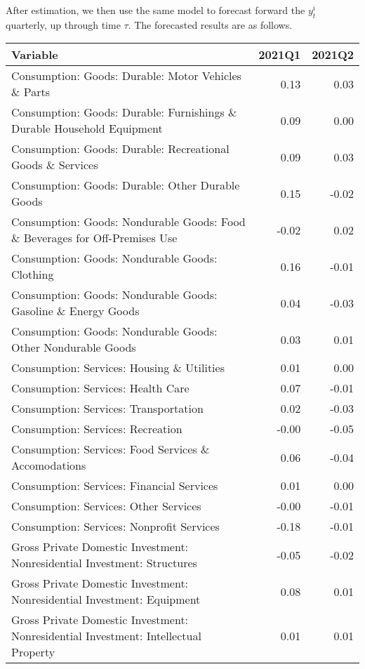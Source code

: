 \documentclass[11pt, letterpaper]{article}\usepackage[]{graphicx}\usepackage[]{color}
\begin{document}
After estimation, we then use the same model to forecast forward the $y^i_t$ quarterly, up through time $\tau$. 
The forecasted results are as follows.
\begin{table}[H]
\centering
\begingroup\scriptsize
\begin{tabular}{lrr}
  \hline
Variable & 2021Q1 & 2021Q2 \\ 
  \hline
Consumption: Goods: Durable: Motor Vehicles \& Parts & 0.13 & 0.03 \\ 
  Consumption: Goods: Durable: Furnishings \& Durable Household Equipment & 0.09 & 0.00 \\ 
  Consumption: Goods: Durable: Recreational Goods \& Services & 0.09 & 0.03 \\ 
  Consumption: Goods: Durable: Other Durable Goods & 0.15 & -0.02 \\ 
  Consumption: Goods: Nondurable Goods: Food \& Beverages for Off-Premises Use & -0.02 & 0.02 \\ 
  Consumption: Goods: Nondurable Goods: Clothing & 0.16 & -0.01 \\ 
  Consumption: Goods: Nondurable Goods: Gasoline \& Energy Goods & 0.04 & -0.03 \\ 
  Consumption: Goods: Nondurable Goods: Other Nondurable Goods & 0.03 & 0.01 \\ 
  Consumption: Services: Housing \& Utilities & 0.01 & 0.00 \\ 
  Consumption: Services: Health Care & 0.07 & -0.01 \\ 
  Consumption: Services: Transportation & 0.02 & -0.03 \\ 
  Consumption: Services: Recreation & -0.00 & -0.05 \\ 
  Consumption: Services: Food Services \& Accomodations & 0.06 & -0.04 \\ 
  Consumption: Services: Financial Services & 0.01 & 0.00 \\ 
  Consumption: Services: Other Services & -0.00 & -0.01 \\ 
  Consumption: Services: Nonprofit Services & -0.18 & -0.01 \\ 
  Gross Private Domestic Investment: Nonresidential Investment: Structures & -0.05 & -0.02 \\ 
  Gross Private Domestic Investment: Nonresidential Investment: Equipment & 0.08 & 0.01 \\ 
  Gross Private Domestic Investment: Nonresidential Investment: Intellectual Property & 0.01 & 0.01 \\ 

\end{tabular}
\end{table}
\end{document}
